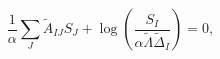 \begin{equation} \label{sequation}
\frac{1}{\alpha }\sum_{J}\tilde{A}_{IJ}S_{J}+\log \left( \frac{S_{I}}{\alpha
\tilde{\Lambda}\tilde{\Delta}_{I}}\right) =0,
\end{equation}

